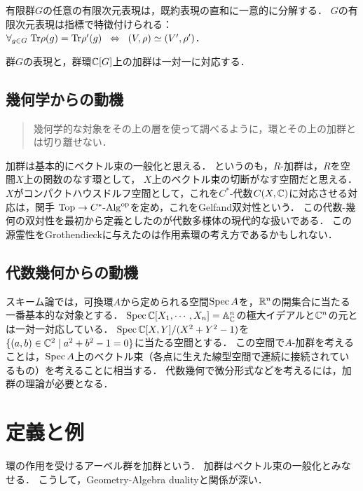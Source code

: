 \documentclass[uplatex,dvipdfmx]{jsreport}
\begin{document}
\begin{theorem}
    有限群$G$の任意の有限次元表現は，既約表現の直和に一意的に分解する．
    $G$の有限次元表現は指標で特徴付けられる：$\forall_{g\in G}\;\mathrm{Tr}\rho(g)=\mathrm{Tr}\rho'(g)\;\;\Leftrightarrow\;\;(V,\rho)\simeq(V',\rho')$．
\end{theorem}

\begin{theorem}
    群$G$の表現と，群環$\mathbb{C}[G]$上の加群は一対一に対応する．
\end{theorem}

\subsection{幾何学からの動機}

\begin{quotation}
    幾何学的な対象をその上の層を使って調べるように，環とその上の加群とは切り離せない．\cite{斎藤毅}
\end{quotation}

加群は基本的にベクトル束の一般化と思える．
というのも，$R$-加群は，$R$を空間$X$上の関数のなす環として，
$X$上のベクトル束の切断がなす空間だと思える．
$X$がコンパクトハウスドルフ空間として，これを$C^*$-代数$C(X,\mathbb{C})$に対応させる対応は，関手
$\mathrm{Top}\to C^*\textrm{-}\mathrm{Alg}^{\mathrm{op}}$を定め，これをGelfand双対性という．
この代数-幾何の双対性を最初から定義としたのが代数多様体の現代的な扱いである．
この源霊性をGrothendieckに与えたのは作用素環の考え方であるかもしれない．

\subsection{代数幾何からの動機}

スキーム論では，可換環$A$から定められる空間$\mathrm{Spec}\, A$を，$\mathbb{R}^n$の開集合に当たる一番基本的な対象とする．
$\mathrm{Spec}\,\mathbb{C}[X_1,\cdots,X_n]=\mathbb{A}_{\mathbb{C}}^n$の極大イデアルと$\mathbb{C}^n$の元とは一対一対応している．
$\mathrm{Spec}\,\mathbb{C}[X,Y]/(X^2+Y^2-1)$を$\{(a,b)\in\mathbb{C}^2\mid a^2+b^2-1=0\}$に当たる空間とする．
この空間で$A$-加群を考えることは，$\mathrm{Spec}\, A$上のベクトル束（各点に生えた線型空間で連続に接続されているもの）を考えることに相当する．
代数幾何で微分形式などを考えるには，加群の理論が必要となる．

\section{定義と例}

\begin{tcolorbox}[colframe=ForestGreen, colback=ForestGreen!10!white,breakable,colbacktitle=ForestGreen!40!white,coltitle=black,fonttitle=\bfseries\sffamily,
title=]
    環の作用を受けるアーベル群を加群という．
    加群はベクトル束の一般化とみなせる．
    こうして，Geometry-Algebra dualityと関係が深い．
\end{tcolorbox}
\end{document}
